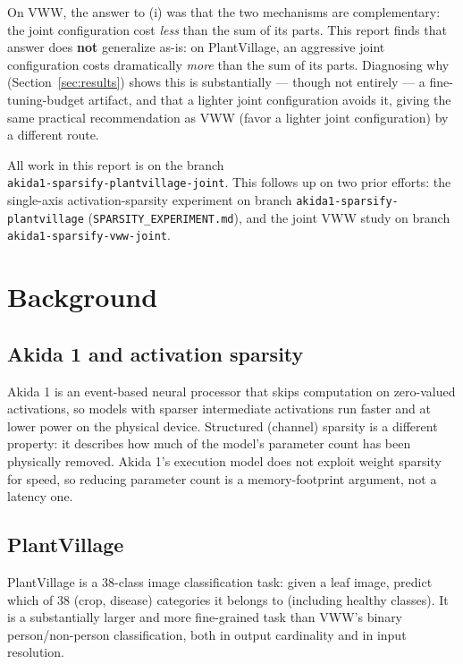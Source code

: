 \documentclass[11pt]{article}
\newcommand{\code}[1]{\texttt{#1}}
\begin{document}
On VWW, the answer to (i) was that the two mechanisms are complementary: the joint configuration cost \emph{less} than the sum of its parts. This report finds that answer does \textbf{not} generalize as-is: on PlantVillage, an aggressive joint configuration costs dramatically \emph{more} than the sum of its parts. Diagnosing why (Section~\ref{sec:results}) shows this is substantially --- though not entirely --- a fine-tuning-budget artifact, and that a lighter joint configuration avoids it, giving the same practical recommendation as VWW (favor a lighter joint configuration) by a different route.

All work in this report is on the branch\\
\code{akida1-\allowbreak sparsify-\allowbreak plantvillage-\allowbreak joint}.
This follows up on two prior efforts: the single-axis activation-sparsity
experiment on branch \code{akida1-\allowbreak sparsify-\allowbreak plantvillage}
(\code{SPARSITY\_EXPERIMENT.\allowbreak md}), and the joint VWW study on branch
\code{akida1-\allowbreak sparsify-\allowbreak vww-\allowbreak joint}.

\section{Background}

\subsection{Akida 1 and activation sparsity}

Akida 1 is an event-based neural processor that skips computation on zero-valued activations, so models with sparser intermediate activations run faster and at lower power on the physical device. Structured (channel) sparsity is a different property: it describes how much of the model's parameter count has been physically removed. Akida 1's execution model does not exploit weight sparsity for speed, so reducing parameter count is a memory-footprint argument, not a latency one.

\subsection{PlantVillage}

PlantVillage is a 38-class image classification task: given a leaf image, predict which of 38 (crop, disease) categories it belongs to (including healthy classes). It is a substantially larger and more fine-grained task than VWW's binary person/non-person classification, both in output cardinality and in input resolution.
\end{document}
